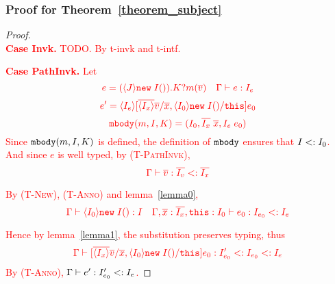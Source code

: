 \subsubsection{Proof for Theorem~\ref{theorem_subject}}
\begin{proof} ~\\
\noindent\textcolor{red}{\textbf{Case Invk.} TODO. By t-invk and t-intf.}

\noindent\textcolor{red}{\textbf{Case PathInvk.} Let}
  $$\textcolor{red}{e = (\langle J \rangle\texttt{new} \; I()).K?m(\overline{v}) \quad \Gamma \; {\vdash} \; e : I_e}$$
  $$\textcolor{red}{e' = \langle I_e \rangle[\overline{\langle I_x \rangle} \overline{v}/\overline{x}, \langle I_0 \rangle\texttt{new} \; I()/\texttt{this}]e_0}$$
  $$\textcolor{red}{\texttt{mbody}(m, I, K) = (I_0, \overline{I_x} \; \overline{x}, I_e \; e_0)}$$
\textcolor{red}{Since $\texttt{mbody}(m, I, K)$ is defined, the definition of $\texttt{mbody}$ ensures that $I <: I_0$. And since $e$ is well typed, by \textsc{(T-PathInvk)},}
  $$\textcolor{red}{\Gamma \; {\vdash} \; \overline{v} : \overline{I_v} <: \overline{I_x}}$$

\noindent \textcolor{red}{By \textsc{(T-New)}, \textsc{(T-Anno)} and lemma~\ref{lemma0},}
  $$\textcolor{red}{\Gamma \; {\vdash} \; \langle I_0 \rangle\texttt{new} \; I() : I \quad \Gamma, \overline{x} : \overline{I_x}, \texttt{this} : I_0 \; {\vdash} \; e_0 : I_{e_0} <: I_e}$$

\noindent \textcolor{red}{Hence by lemma~\ref{lemma1}, the substitution preserves typing, thus}
  $$\textcolor{red}{\Gamma \; {\vdash} \; [\overline{\langle I_x \rangle} \overline{v}/\overline{x}, \langle I_0 \rangle\texttt{new} \; I()/\texttt{this}]e_0 : I'_{e_0} <: I_{e_0} <: I_e}$$
\noindent \textcolor{red}{By \textsc{(T-Anno)}, $\Gamma \; {\vdash} \; e' : I'_{e_0} <: I_e$.}

\begin{comment}
\noindent \textbf{Case Invk.} 
let \[ e = \angl{J}\new I.m(\overline{\angl{I_e}}\overline{e}) \] 
Suppose \[ \mbody(m, I, J) = (J', \overline{I_x} \; \overline{x}, I_{e_0} \; e_0) \] 
then \[ e' =  [\overline{\angl{I_x}} \overline{e}/\overline{x}, \; \angl{J}\new I/\kwthis ] e_0 \] 
By rules \textsc{(T-New)} and \textsc{(T-Invk)}, 
  \[ \judgeewf \Gamma {\new I:I} \quad 
     \mtype(m, I, J) = \overline{I_x} \rightarrow I_{e_0} \quad 
     \judgeewf \Gamma {\overline{e} : \overline{I_e'}} \quad
     \overline{I_e'} \subtype \overline{I_x} \quad
     \textit{, for some } \; \overline{I_e'}
  \]
By Lemma~\ref{lemma0},
    \[
    \judgeewf {\Gamma, \overline{x}:\overline{I_x}, \kwthis:J_0} {e_0:I_f} \textit{, for some } J \subtype J_0 \textit{ and } I_f \subtype I_{e_0}
    \]
By Lemma~\ref{lemma1},
    \[
    \judgeewf {\Gamma} {[\overline{\angl{I_x}} \overline{e}/\overline{x}, \; \angl{J}\new I/\kwthis ] e_0  :  I_g} \textit{, for some } I_g \subtype I_f 
    \]
So $I_g <: I_{e_0}$, finally just let $I' = I_g$.


\end{comment}
\end{proof}
